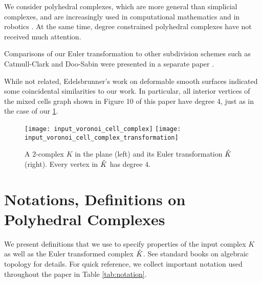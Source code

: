 We consider polyhedral complexes, which are more general than simplicial complexes, and are increasingly used in computational mathematics \cite{FlGiSu2014,GiRaBa2012,MuWaWa2014} and in robotics \cite{GaCa2013,GaMoAbMa2006}.
At the same time, degree constrained polyhedral complexes have not received much attention.

Comparisons of our Euler transformation to other subdivision schemes such as Catmull-Clark \cite{CatmullClark1978} and Doo-Sabin \cite{DoSa1978} were presented in a separate paper \cite{GuKrDr2020}.

While not related, Edelsbrunner's work on deformable smooth surfaces \cite{Ed1999} indicated some coincidental similarities to our work.
In particular, all interior vertices of the mixed cells graph shown in Figure 10 of this paper \cite{Ed1999} have degree 4, just as in the case of our \cref{fig:eulermeshillust}.
%
\begin{figure}[hbp!] 
    \centering
    \texttt{[image: input\_voronoi\_cell\_complex]}
    \quad\quad
    \texttt{[image: input\_voronoi\_cell\_complex\_transformation]}
    \caption{
      A $2$-complex $K$ in the plane (left) and its Euler transformation $\hat{K}$ (right).
      Every vertex in $\hat{K}$ has degree $4$.
    }
    \label{fig:eulermeshillust}
\end{figure}

\section{Notations, Definitions on Polyhedral Complexes} \label{sec:defns}

We present definitions that we use to specify properties of the input complex $K$ as well as the Euler transformed complex $\hat{K}$.
See standard books on algebraic topology \cite{Hatcher2002,Munkres1984} for details.
For quick reference, we collect important notation used throughout the paper in Table \ref{tab:notation}.


